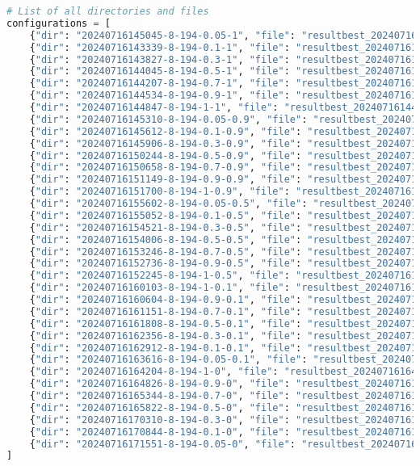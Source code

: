 \documentclass[12pt,a4paper]{article}
\begin{document}
\begin{lstlisting}[language=python, title=Showcase of implementation. Files are recorded using all\_stats.py.]
# List of all directories and files
configurations = [
    {"dir": "20240716145045-8-194-0.05-1", "file": "resultbest_20240716145045.csv"},
    {"dir": "20240716143339-8-194-0.1-1", "file": "resultbest_20240716143339.csv"},
    {"dir": "20240716143827-8-194-0.3-1", "file": "resultbest_20240716143827.csv"},
    {"dir": "20240716144045-8-194-0.5-1", "file": "resultbest_20240716144045.csv"},
    {"dir": "20240716144207-8-194-0.7-1", "file": "resultbest_20240716144207.csv"},
    {"dir": "20240716144534-8-194-0.9-1", "file": "resultbest_20240716144534.csv"},
    {"dir": "20240716144847-8-194-1-1", "file": "resultbest_20240716144847.csv"},
    {"dir": "20240716145310-8-194-0.05-0.9", "file": "resultbest_20240716145310.csv"},
    {"dir": "20240716145612-8-194-0.1-0.9", "file": "resultbest_20240716145612.csv"},
    {"dir": "20240716145906-8-194-0.3-0.9", "file": "resultbest_20240716145906.csv"},
    {"dir": "20240716150244-8-194-0.5-0.9", "file": "resultbest_20240716150244.csv"},
    {"dir": "20240716150658-8-194-0.7-0.9", "file": "resultbest_20240716150658.csv"},
    {"dir": "20240716151149-8-194-0.9-0.9", "file": "resultbest_20240716151149.csv"},
    {"dir": "20240716151700-8-194-1-0.9", "file": "resultbest_20240716151700.csv"},
    {"dir": "20240716155602-8-194-0.05-0.5", "file": "resultbest_20240716155602.csv"},
    {"dir": "20240716155052-8-194-0.1-0.5", "file": "resultbest_20240716155052.csv"},
    {"dir": "20240716154521-8-194-0.3-0.5", "file": "resultbest_20240716154521.csv"},
    {"dir": "20240716154006-8-194-0.5-0.5", "file": "resultbest_20240716154006.csv"},
    {"dir": "20240716153246-8-194-0.7-0.5", "file": "resultbest_20240716153246.csv"},
    {"dir": "20240716152736-8-194-0.9-0.5", "file": "resultbest_20240716152736.csv"},
    {"dir": "20240716152245-8-194-1-0.5", "file": "resultbest_20240716152245.csv"},
    {"dir": "20240716160103-8-194-1-0.1", "file": "resultbest_20240716160103.csv"},
    {"dir": "20240716160604-8-194-0.9-0.1", "file": "resultbest_20240716160604.csv"},
    {"dir": "20240716161151-8-194-0.7-0.1", "file": "resultbest_20240716161151.csv"},
    {"dir": "20240716161808-8-194-0.5-0.1", "file": "resultbest_20240716161808.csv"},
    {"dir": "20240716162356-8-194-0.3-0.1", "file": "resultbest_20240716162356.csv"},
    {"dir": "20240716162912-8-194-0.1-0.1", "file": "resultbest_20240716162912.csv"},
    {"dir": "20240716163616-8-194-0.05-0.1", "file": "resultbest_20240716163616.csv"},
    {"dir": "20240716164204-8-194-1-0", "file": "resultbest_20240716164204.csv"},
    {"dir": "20240716164826-8-194-0.9-0", "file": "resultbest_20240716164826.csv"},
    {"dir": "20240716165344-8-194-0.7-0", "file": "resultbest_20240716165344.csv"},
    {"dir": "20240716165822-8-194-0.5-0", "file": "resultbest_20240716165822.csv"},
    {"dir": "20240716170310-8-194-0.3-0", "file": "resultbest_20240716170310.csv"},
    {"dir": "20240716170844-8-194-0.1-0", "file": "resultbest_20240716170844.csv"},
    {"dir": "20240716171551-8-194-0.05-0", "file": "resultbest_20240716171551.csv"},
]


\end{lstlisting}
\end{document}
